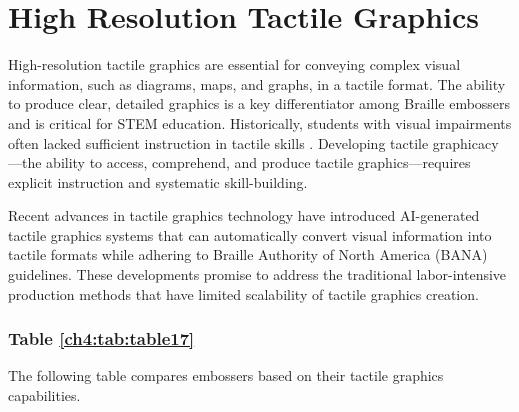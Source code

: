 \section{High Resolution Tactile Graphics}\label{ch4:sec:tactile-graphics}

High-resolution tactile graphics are essential for conveying complex visual information, such as diagrams, maps, and graphs, in a tactile format. The ability to produce clear, detailed graphics is a key differentiator among Braille embossers and is critical for STEM education. Historically, students with visual impairments often lacked sufficient instruction in tactile skills \supercite{TactileSkillsDevelopment}. Developing tactile graphicacy—the ability to access, comprehend, and produce tactile graphics—requires explicit instruction and systematic skill-building.

Recent advances in tactile graphics technology have introduced AI-generated tactile graphics systems that can automatically convert visual information into tactile formats while adhering to Braille Authority of North America (BANA) guidelines. These developments promise to address the traditional labor-intensive production methods that have limited scalability of tactile graphics creation.

\subsubsection{Table \ref{ch4:tab:table17}}
The following table compares embossers based on their tactile graphics capabilities.

